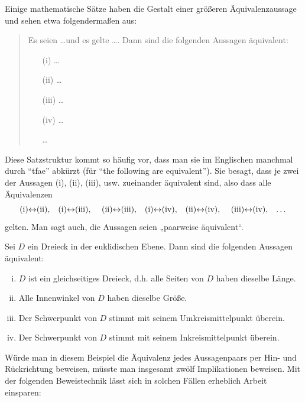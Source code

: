 \begin{de} \label{tfaw}
 Einige mathematische Sätze haben die Gestalt einer größeren Äquivalenzaussage und sehen etwa folgendermaßen aus:
 \begin{quote}
  Es seien \dots und es gelte \dots. Dann sind die folgenden Aussagen äquivalent:
  \begin{itemize}
   \item[(i)] \dots
   \item[(ii)] \dots
   \item[(iii)] \dots
   \item[(iv)] \dots
   \item[\dots]
  \end{itemize}
 \end{quote}
 Diese Satzstruktur kommt so häufig vor, dass man sie im Englischen manchmal durch ``tfae'' abkürzt (für ``the following are equivalent''). Sie besagt, dass je zwei der Aussagen (i), (ii), (iii), usw. zueinander äquivalent sind, also dass alle Äquivalenzen
 \[ \text{(i)$\leftrightarrow$(ii),\quad (i)$\leftrightarrow$(iii), \quad (ii)$\leftrightarrow$(iii),\quad (i)$\leftrightarrow$(iv),\quad (ii)$\leftrightarrow$(iv), \quad (iii)$\leftrightarrow$(iv),\quad \dots} \]
 gelten. Man sagt auch, die Aussagen seien „paarweise äquivalent“.
 \end{de}

 
 
 
 \begin{bsp}
Sei $D$ ein Dreieck in der euklidischen Ebene. Dann sind die folgenden Aussagen äquivalent:
\begin{enumerate}[(i)]
 \item $D$ ist ein gleichseitiges Dreieck, d.h. alle Seiten von $D$ haben dieselbe Länge.
 \item Alle Innenwinkel von $D$ haben dieselbe Größe.
 \item Der Schwerpunkt von $D$ stimmt mit seinem Umkreismittelpunkt überein.
 \item Der Schwerpunkt von $D$ stimmt mit seinem Inkreismittelpunkt überein.
\end{enumerate}
 \end{bsp}

Würde man in diesem Beispiel die Äquivalenz jedes Aussagenpaars per Hin- und Rückrichtung beweisen, müsste man insgesamt zwölf Implikationen beweisen. Mit der folgenden Beweistechnik lässt sich in solchen Fällen erheblich Arbeit einsparen:

